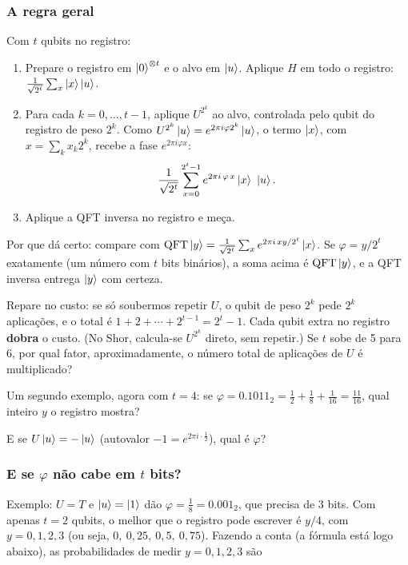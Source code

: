 \subsubsection{A regra geral}\label{a-regra-geral}

Com \(t\) qubits no registro:

\begin{enumerate}
\def\labelenumi{\arabic{enumi}.}
\tightlist
\item
  Prepare o registro em \(\left|{0}\right>^{\otimes t}\) e o alvo em \(\left|{u}\right>\). Aplique \(H\) em todo o registro: \(\tfrac1{\sqrt{2^t}}\sum_{x}\left|{x}\right>\left|{u}\right>\).
\item
  Para cada \(k=0,\dots,t-1\), aplique \(U^{2^k}\) ao alvo, controlada pelo qubit do registro de peso \(2^k\). Como \(U^{2^k}\left|{u}\right>=e^{2\pi i\varphi 2^k}\left|{u}\right>\), o termo \(\left|{x}\right>\), com \(x=\sum_k x_k2^k\), recebe a fase \(e^{2\pi i\varphi x}\):
  \[
  \frac{1}{\sqrt{2^t}}\sum_{x=0}^{2^t-1} e^{2\pi i\,\varphi\, x}\left|{x}\right>\ \left|{u}\right>.
  \]
\item
  Aplique a QFT inversa no registro e meça.
\end{enumerate}

Por que dá certo: compare com \(\mathrm{QFT}\left|{y}\right>=\tfrac1{\sqrt{2^t}}\sum_x e^{2\pi i\,xy/2^t}\left|{x}\right>\). Se \(\varphi=y/2^t\) exatamente (um número com \(t\) bits binários), a soma acima é \(\mathrm{QFT}\left|{y}\right>\), e a QFT inversa entrega \(\left|{y}\right>\) com certeza.

Repare no custo: se só soubermos repetir \(U\), o qubit de peso \(2^k\) pede \(2^k\) aplicações, e o total é \(1+2+\cdots+2^{t-1}=2^t-1\). Cada qubit extra no registro \textbf{dobra} o custo. (No Shor, calcula-se \(U^{2^k}\) direto, sem repetir.) Se \(t\) sobe de 5 para 6, por qual fator, aproximadamente, o número total de aplicações de \(U\) é multiplicado?

Um segundo exemplo, agora com \(t=4\): se \(\varphi=0.1011_2=\tfrac12+\tfrac18+\tfrac1{16}=\tfrac{11}{16}\), qual inteiro \(y\) o registro mostra?

E se \(U\left|{u}\right>=-\left|{u}\right>\) (autovalor \(-1=e^{2\pi i\cdot\frac12}\)), qual é \(\varphi\)?

\subsubsection{\texorpdfstring{E se \(\varphi\) não cabe em \(t\) bits?}{E se \textbackslash varphi não cabe em t bits?}}\label{e-se-varphi-nuxe3o-cabe-em-t-bits}

Exemplo: \(U=T\) e \(\left|{u}\right>=\left|{1}\right>\) dão \(\varphi=\tfrac18=0.001_2\), que precisa de 3 bits. Com apenas \(t=2\) qubits, o melhor que o registro pode escrever é \(y/4\), com \(y=0,1,2,3\) (ou seja, \(0,\ 0{,}25,\ 0{,}5,\ 0{,}75\)). Fazendo a conta (a fórmula está logo abaixo), as probabilidades de medir \(y=0,1,2,3\) são

